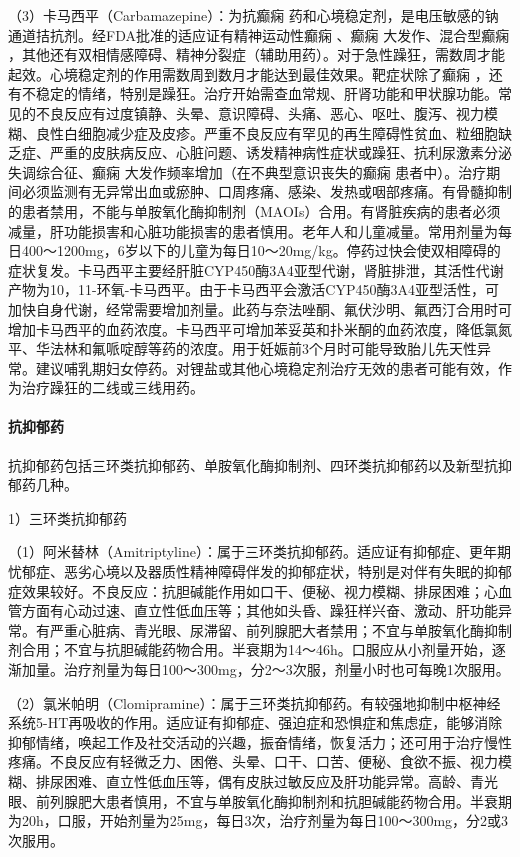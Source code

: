 （3）卡马西平（Carbamazepine）：为抗癫痫
药和心境稳定剂，是电压敏感的钠通道拮抗剂。经FDA批准的适应证有精神运动性癫痫
、癫痫
大发作、混合型癫痫
，其他还有双相情感障碍、精神分裂症（辅助用药）。对于急性躁狂，需数周才能起效。心境稳定剂的作用需数周到数月才能达到最佳效果。靶症状除了癫痫
，还有不稳定的情绪，特别是躁狂。治疗开始需查血常规、肝肾功能和甲状腺功能。常见的不良反应有过度镇静、头晕、意识障碍、头痛、恶心、呕吐、腹泻、视力模糊、良性白细胞减少症及皮疹。严重不良反应有罕见的再生障碍性贫血、粒细胞缺乏症、严重的皮肤病反应、心脏问题、诱发精神病性症状或躁狂、抗利尿激素分泌失调综合征、癫痫
大发作频率增加（在不典型意识丧失的癫痫
患者中）。治疗期间必须监测有无异常出血或瘀肿、口周疼痛、感染、发热或咽部疼痛。有骨髓抑制的患者禁用，不能与单胺氧化酶抑制剂（MAOIs）合用。有肾脏疾病的患者必须减量，肝功能损害和心脏功能损害的患者慎用。老年人和儿童减量。常用剂量为每日400～1200mg，6岁以下的儿童为每日10～20mg/kg。停药过快会使双相障碍的症状复发。卡马西平主要经肝脏CYP450酶3A4亚型代谢，肾脏排泄，其活性代谢产物为10，11-环氧-卡马西平。由于卡马西平会激活CYP450酶3A4亚型活性，可加快自身代谢，经常需要增加剂量。此药与奈法唑酮、氟伏沙明、氟西汀合用时可增加卡马西平的血药浓度。卡马西平可增加苯妥英和扑米酮的血药浓度，降低氯氮平、华法林和氟哌啶醇等药的浓度。用于妊娠前3个月时可能导致胎儿先天性异常。建议哺乳期妇女停药。对锂盐或其他心境稳定剂治疗无效的患者可能有效，作为治疗躁狂的二线或三线用药。
\paragraph{抗抑郁药}

抗抑郁药包括三环类抗抑郁药、单胺氧化酶抑制剂、四环类抗抑郁药以及新型抗抑郁药几种。

1）三环类抗抑郁药

（1）阿米替林（Amitriptyline）：属于三环类抗抑郁药。适应证有抑郁症、更年期忧郁症、恶劣心境以及器质性精神障碍伴发的抑郁症状，特别是对伴有失眠的抑郁症效果较好。不良反应：抗胆碱能作用如口干、便秘、视力模糊、排尿困难；心血管方面有心动过速、直立性低血压等；其他如头昏、躁狂样兴奋、激动、肝功能异常。有严重心脏病、青光眼、尿滞留、前列腺肥大者禁用；不宜与单胺氧化酶抑制剂合用；不宜与抗胆碱能药物合用。半衰期为14～46h。口服应从小剂量开始，逐渐加量。治疗剂量为每日100～300mg，分2～3次服，剂量小时也可每晚1次服用。

（2）氯米帕明（Clomipramine）：属于三环类抗抑郁药。有较强地抑制中枢神经系统5-HT再吸收的作用。适应证有抑郁症、强迫症和恐惧症和焦虑症，能够消除抑郁情绪，唤起工作及社交活动的兴趣，振奋情绪，恢复活力；还可用于治疗慢性疼痛。不良反应有轻微乏力、困倦、头晕、口干、口苦、便秘、食欲不振、视力模糊、排尿困难、直立性低血压等，偶有皮肤过敏反应及肝功能异常。高龄、青光眼、前列腺肥大患者慎用，不宜与单胺氧化酶抑制剂和抗胆碱能药物合用。半衰期为20h，口服，开始剂量为25mg，每日3次，治疗剂量为每日100～300mg，分2或3次服用。

